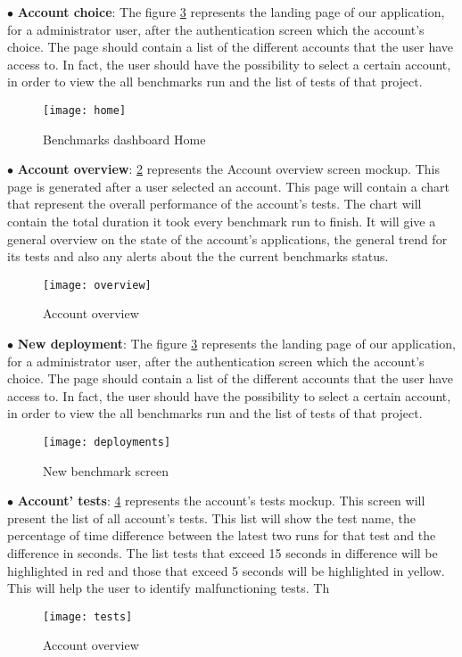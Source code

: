 $\bullet$ \textbf{Account choice}:
The figure
\hyperref[fig:benchmarks_dashboard_home]{\ref{fig:benchmarks_dashboard_home}}
represents the landing page of our application, for a administrator user,
after the authentication screen which the account's choice. The page should
contain a list of the different accounts that the user have access to. In fact,
the user should have the possibility to select a certain account, in order to
view the all benchmarks run and the list of tests of that project.

\begin{figure}[ht]
\texttt{[image: home]}
\caption{Benchmarks dashboard Home}
\label{fig:benchmarks_dashboard_home}
\end{figure}

$\bullet$ \textbf{Account overview}:
\hyperref[fig:benchmarks_dashboard_overview]{\ref{fig:benchmarks_dashboard_overview}}
represents the Account overview screen mockup. This page is generated after a
user selected an account. This page will contain a chart that represent the
overall performance of the account's tests. The chart will contain the total
duration it took every benchmark run to finish. It will give a general overview
on the state of the account's applications, the general trend for its tests and
also any alerts about the the current benchmarks status.

\begin{figure}[ht]
\texttt{[image: overview]}
\caption{Account overview}
\label{fig:benchmarks_dashboard_overview}
\end{figure}

$\bullet$ \textbf{New deployment}:
The figure
\hyperref[fig:benchmarks_dashboard_home]{\ref{fig:benchmarks_dashboard_home}}
represents the landing page of our application, for a administrator user,
after the authentication screen which the account's choice. The page should
contain a list of the different accounts that the user have access to. In fact,
the user should have the possibility to select a certain account, in order to
view the all benchmarks run and the list of tests of that project.

\begin{figure}[ht]
  \texttt{[image: deployments]}
  \caption{New benchmark screen}
\label{fig:benchmarks_dashboard_home}
\end{figure}

$\bullet$ \textbf{Account' tests}:
\hyperref[fig:benchmarks_dashboard_tests]{\ref{fig:benchmarks_dashboard_tests}}
represents the account's tests mockup. This screen will present the list of all
account's tests. This list will show the test name, the percentage of time
difference between the latest two runs for that test and the difference in
seconds. The list tests that exceed 15 seconds in difference will be highlighted
in red and those that exceed 5 seconds will be highlighted in yellow. This will
help the user to identify malfunctioning tests. Th

\begin{figure}[ht]
\texttt{[image: tests]}
\caption{Account overview}
\label{fig:benchmarks_dashboard_tests}
\end{figure}


